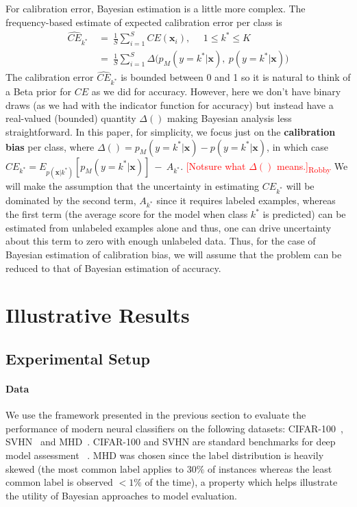 \documentclass{article}
\newcommand{\ux}{{\mathbf{x}}}
\newcommand{\robby}[1]{\textcolor{Red}{[#1]\textsubscript{Robby}}}
\begin{document}
For calibration error, Bayesian estimation is a little more complex.
The frequency-based estimate of expected calibration error per class is
\begin{align*}
\hat{CE}_{k^*} & \ = \  \frac{1}{S} \sum_{i=1}^S CE(\ux_i), \ \  \ \ \ \ 1 \le k^* \le K \\
 &  \ = \  \frac{1}{S} \sum_{i=1}^S \Delta\bigl(p_M(y = k^*| \ux), \  p(y =k^*| \ux)  \bigr)
\end{align*}
The calibration error $\hat{CE}_{k^*}$ is bounded between 0 and 1 so it is natural to think of a Beta prior for $CE$ as we did for accuracy.
However, here we don't have binary draws (as we had with the indicator function for accuracy) but instead have a real-valued (bounded) quantity $\Delta(  )$ making Bayesian analysis less straightforward.
In this paper, for simplicity, we focus just on the {\bf calibration bias}  per class, where  $\Delta( ) = p_M(y = k^*| \ux) - p(y =k^*| \ux)$, in which case
$CE_{k^*} = %
E_{p(\ux|k^*)}[ p_M(y = k^*| \ux)] \ - \  {A}_{k^*} $.
\robby{Notsure what $\Delta(  )$ means.}
We will make the assumption that the uncertainty in estimating $CE_{k^*}$ will be dominated by the second term, ${A}_{k^*}$ since it requires labeled examples, whereas the first term (the average score for the model when class $k^*$ is predicted) can be estimated from unlabeled examples alone and thus, one can drive uncertainty about this term to zero with enough unlabeled data. Thus, for the case of Bayesian estimation of calibration bias, we will assume that the problem can be reduced to that of Bayesian estimation of accuracy.





\section{Illustrative Results}


\subsection{Experimental Setup}

\paragraph{Data}
We use the framework presented in the previous section to evaluate the performance of modern neural classifiers on the following datasets:
    CIFAR-100~\cite{krizhevsky2009learning},
    SVHN~\cite{netzer2011reading} and
    MHD~\cite{tai_seale2016mhd}.
CIFAR-100 and SVHN are standard benchmarks for deep model assessment ~\cite{guo2017calibration, hendrycks2019benchmarking}.
MHD was chosen since the label distribution is heavily skewed (the most common label applies to $30\%$ of instances whereas the least common label is observed $<1\%$ of the time), a property which helps illustrate the utility of Bayesian approaches to model evaluation.
\end{document}
